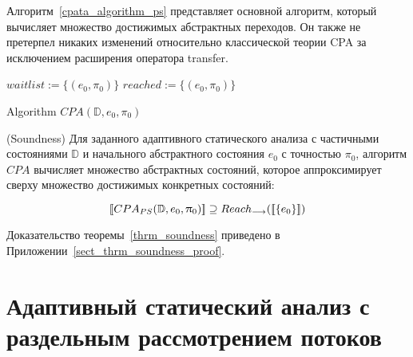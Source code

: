 Алгоритм~\ref{cpata_algorithm_ps} представляет основной алгоритм, который вычисляет множество достижимых абстрактных переходов.
Он также не претерпел никаких изменений относительно классической теории CPA за исключением расширения оператора transfer.
 
\begin{algorithm}
 $waitlist := \{(e_0, \pi_0)\}$\;
 $reached := \{(e_0, \pi_0)\}$\;


 \caption{Algorithm $CPA(\mathbb{D}, e_0, \pi_0)$}
 \label{cpata_algorithm_ps}
\end{algorithm} 
 
\begin{thrm}
\label{thrm_soundness}
(Soundness) Для заданного адаптивного статического анализа с частичными состояниями $\mathbb{D}$ и начального абстрактного состояния $e_0$ с точностью $\pi_0$, алгоритм $CPA$ вычисляет множество абстрактных состояний, которое аппроксимирует сверху множество достижимых конкретных состояний:

$$[\![ CPA_{PS}(\mathbb{D}, e_0, \uppi_0) ]\!] \supseteq Reach_{\longrightarrow}([\![ \{e_0\} ]\!])$$

\end{thrm}

Доказательство теоремы~\ref{thrm_soundness} приведено в Приложении~\ref{sect_thrm_soundness_proof}.

\newcommand{\IR}{IR}
\newcommand{\conctm}[1]{\conc{#1}_{TM}}

\section{Адаптивный статический анализ с раздельным рассмотрением потоков}
\label{sect_tm_cpa}

